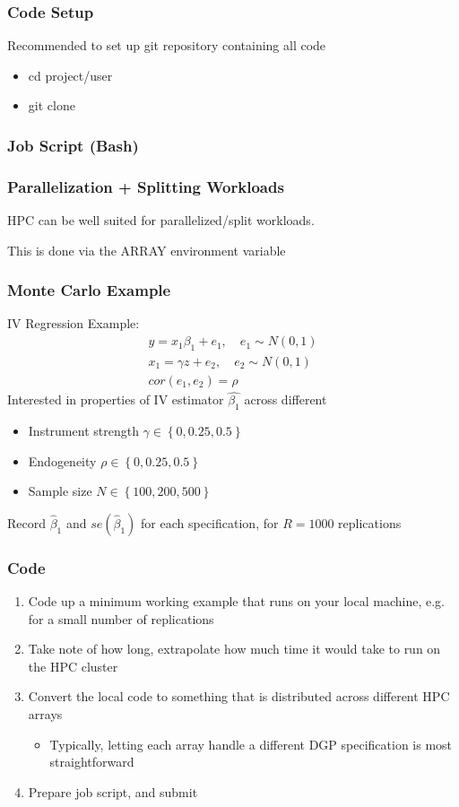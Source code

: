 \documentclass[aspectratio=169,notheorems]{beamer}
\theoremstyle{plain}
\theoremstyle{plain}
\numberwithin{equation}{section}
\begin{document}
\begin{frame}
\frametitle{Code Setup}
Recommended to set up git repository containing all code
\begin{itemize}
\item cd project/user
\item git clone
\end{itemize}

\end{frame}

\begin{frame}
\frametitle{Job Script (Bash)}


\end{frame}


\begin{frame}
\frametitle{Parallelization + Splitting Workloads}
HPC can be well suited for parallelized/split workloads.

This is done via the ARRAY environment variable
\end{frame}

\begin{frame}
\frametitle{Monte Carlo Example}
IV Regression Example:
\begin{align}
y = x_1 \beta_1 + e_1, \quad e_1 \sim N (0, 1) \\
x_1 = \gamma z + e_2, \quad e_2 \sim N(0, 1) \\
cor(e_1, e_2) = \rho
\end{align}
Interested in properties of IV estimator $\widehat{\beta_1}$ across different 
\begin{itemize}
\item Instrument strength $\gamma \in \left\lbrace 0, 0.25, 0.5\right\rbrace $
\item Endogeneity $\rho \in \left\lbrace 0, 0.25, 0.5 \right\rbrace $
\item Sample size $N \in \left\lbrace 100, 200, 500 \right\rbrace $
\end{itemize}
Record $\widehat{\beta}_1$ and $se(\widehat{\beta}_1)$ for each specification, for $R = 1000$ replications
\end{frame}

\begin{frame}
\frametitle{Code}
\begin{enumerate}
\item Code up a minimum working example that runs on your local machine, e.g. for a small number of replications
\item Take note of how long, extrapolate how much time it would take to run on the HPC cluster
\item Convert the local code to something that is distributed across different HPC arrays
\begin{itemize}
\item Typically, letting each array handle a different DGP specification is most straightforward
\end{itemize}
\item Prepare job script, and submit
\end{enumerate}
\end{frame}
\end{document}
